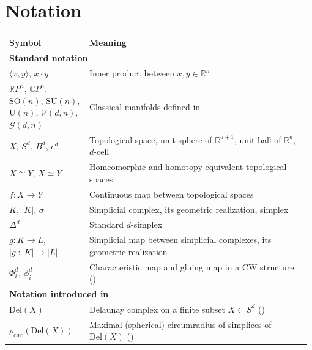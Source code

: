\documentclass[a4paper,english,cleveref,autoref,thm-restate,nolineno]{socg-lipics-v2021}
\newcommand{\C}{\mathbb C}
\newcommand{\R}{\mathbb R}
\newcommand{\geomreal}[1] { |#1| } %
\newcommand{\Del}[1] { \mathrm{Del}(#1) } %
\newcommand{\GG}{\mathcal G} %
\newcommand{\VV}{\mathcal V} %
\begin{document}
\section{Notation}
\label{sec:background}

\begin{longtable}{p{0.26\linewidth}p{0.72\linewidth}}
	\hline
	\textbf{Symbol}  & \textbf{Meaning}	
	\\\hline	
	\multicolumn{2}{l}{\textbf{Standard notation} } \\
	
	$\langle x, y \rangle$, $x\cdot y$ & Inner product between $x,y\in\R^n$ \\

	$\R P^n$, $\C P^n$, $\mathrm{SO}(n)$, $\mathrm{SU}(n)$, $\mathrm{U}(n)$, $\VV(d,n)$, $\GG(d,n)$ & Classical manifolds defined in \Cref{tab:known_triangulations}\\
	
	$X$, $S^{d}$, $B^{d}$, $e^d$ & Topological space, unit sphere of $\R^{d+1}$, unit ball of $\R^{d}$, $d$-cell \\
	
	$X\cong Y$, $X\simeq Y$ & Homeomorphic and homotopy equivalent topological spaces \\
	
	$f\colon X\to Y$ & Continuous map between topological spaces \\
	
	$K$, $\geomreal{K}$, $\sigma$ & Simplicial complex, its geometric realization, simplex\\
	
	$\Delta^d$ & Standard $d$-simplex\\
	
	$g\colon K\to L$, $\geomreal{g}\colon\geomreal{K}\to\geomreal{L}$ & Simplicial map between simplicial complexes, its geometric realization \\
	
	$\Phi_i^d$, $\phi_i^d$ & Characteristic map and gluing map in a CW structure (\Cref{subsec:overview}) \\
	
	\multicolumn{2}{l}{\textbf{Notation introduced in \Cref{sec:delaunay}} } \\
	
	$\Del{X}$ & Delaunay complex on a finite subset $X\subset S^d$ (\Cref{subsec:delaunay_triangulations})\\
	
	$\rho_\mathrm{circ}(\Del{X})$ & Maximal (spherical) circumradius of simplices of $\Del{X}$ (\Cref{subsec:delaunay_triangulations})\\
	

\end{longtable}
\end{document}
